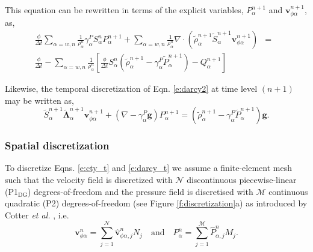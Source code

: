This equation can be rewritten in terms of the explicit variables, $P^{n+1}_\alpha$ and $\mathbf{v}^{n+1}_{\phi \alpha}$, as,
\begin{eqnarray}
\frac{\phi}{\Delta t} \sum_{\alpha = w,n} \frac{1}{\rho^n_\alpha} \gamma^P_\alpha S^n_\alpha P^{n+1}_\alpha + \sum_{\alpha = w,n} \frac{1}{\rho^n_\alpha} \nabla \cdot \left( \tilde{\rho}^{n+1}_\alpha \tilde{S}^{n+1}_\alpha \mathbf{v}_{\phi \alpha}^{n+1} \right) {} & = & \nonumber \\
\frac{\phi}{\Delta t} - \sum_{\alpha = w,n} \frac{1}{\rho^n_\alpha} \left[ \frac{\phi}{\Delta t} S^n_\alpha \left( \tilde{\rho}^{n+1}_\alpha - \gamma^P_\alpha \tilde{P}^{n+1}_\alpha \right) - Q^{n+1}_\alpha \right] & {} & \label{e:cty_t}
\end{eqnarray}

Likewise, the temporal discretization of Eqn. \ref{e:darcy2} at time level $(n+1)$ may be written as,
\begin{equation}\label{e:darcy_t}
\tilde{S}^{n+1}_\alpha \tilde{\mathbf{\Lambda}}^{n+1}_\alpha \mathbf{v}^{n+1}_{\phi\alpha} +\left( \nabla  - \gamma_\alpha^P \mathbf{g} \right) P^{n+1}_\alpha = (\tilde{\rho}^{n+1}_\alpha - \gamma_\alpha^P \tilde{P}^{n+1}_\alpha) \mathbf{g}.
\end{equation}

\subsubsection{Spatial discretization}\label{s:x_discretization}

To discretize Eqns. \ref{e:cty_t} and \ref{e:darcy_t} we assume a finite-element mesh such that the velocity field is discretized with $\mathcal{N}$ discontinuous piecewise-linear (P1$_\mathrm{DG}$) degrees-of-freedom and the pressure field is discretised with $\mathcal{M}$ continuous quadratic (P2) degrees-of-freedom (see Figure \ref{f:discretization}a) as introduced by Cotter \textit{et al.} \cite{cotter_2007}, i.e.
\begin{equation}
\mathbf{v}^n_{\phi \alpha} = \sum_{j=1}^\mathcal{N} \hat{\mathbf{v}}^n_{\phi \alpha,j} N_j \quad \mathrm{and} \quad P^n_\alpha = \sum_{j=1}^\mathcal{M} \hat{P}^n_{\alpha,j} M_j.
\end{equation}

